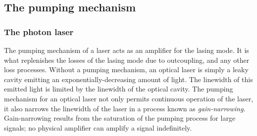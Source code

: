 % 
% 

\subsection{The pumping mechanism}
\label{Introduction:ThePumpingMechanism}

\subsubsection{The photon laser}

The pumping mechanism of a laser acts as an amplifier for the lasing mode.  It is what replenishes the losses of the lasing mode due to outcoupling, and any other loss processes.  Without a pumping mechanism, an optical laser is simply a leaky cavity emitting an exponentially-decreasing amount of light.  The linewidth of this emitted light is limited by the linewidth of the optical cavity.  The pumping mechanism for an optical laser not only permits continuous operation of the laser, it also narrows the linewidth of the laser in a process known as \emph{gain-narrowing}.  Gain-narrowing results from the saturation of the pumping process for large signals; no physical amplifier can amplify a signal indefinitely.  

